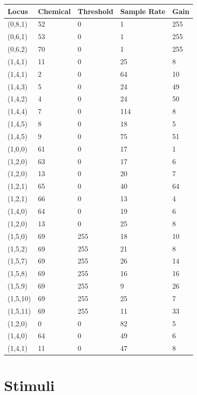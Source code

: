 \documentclass{article}
\begin{document}
\begin{longtable}{|p{2cm}|p{2cm}|p{2cm}|p{2cm}|p{2cm}|}
\hline
{\bf Locus} & {\bf Chemical} & {\bf Threshold} & {\bf Sample Rate} & {\bf Gain} \\ \hline
(0,8,1) & 52 & 0 & 1 & 255 \\ \hline
(0,6,1) & 53 & 0 & 1 & 255 \\ \hline
(0,6,2) & 70 & 0 & 1 & 255 \\ \hline
(1,4,1) & 11 & 0 & 25 & 8 \\ \hline
(1,4,1) & 2 & 0 & 64 & 10 \\ \hline
(1,4,3) & 5 & 0 & 24 & 49 \\ \hline
(1,4,2) & 4 & 0 & 24 & 50 \\ \hline
(1,4,4) & 7 & 0 & 114 & 8 \\ \hline
(1,4,5) & 8 & 0 & 18 & 5 \\ \hline
(1,4,5) & 9 & 0 & 75 & 51 \\ \hline
(1,0,0) & 61 & 0 & 17 & 1 \\ \hline
(1,2,0) & 63 & 0 & 17 & 6 \\ \hline
(1,2,0) & 13 & 0 & 20 & 7 \\ \hline
(1,2,1) & 65 & 0 & 40 & 64 \\ \hline
(1,2,1) & 66 & 0 & 13 & 4 \\ \hline
(1,4,0) & 64 & 0 & 19 & 6 \\ \hline
(1,2,0) & 13 & 0 & 25 & 8 \\ \hline
(1,5,0) & 69 & 255 & 18 & 10 \\ \hline
(1,5,2) & 69 & 255 & 21 & 8 \\ \hline
(1,5,7) & 69 & 255 & 26 & 14 \\ \hline
(1,5,8) & 69 & 255 & 16 & 16 \\ \hline
(1,5,9) & 69 & 255 & 9 & 26 \\ \hline
(1,5,10) & 69 & 255 & 25 & 7 \\ \hline
(1,5,11) & 69 & 255 & 11 & 33 \\ \hline
(1,2,0) & 0 & 0 & 82 & 5 \\ \hline
(1,4,0) & 64 & 0 & 49 & 6 \\ \hline
(1,4,1) & 11 & 0 & 47 & 8 \\ \hline
\end{longtable}

\section*{Stimuli}
\end{document}
